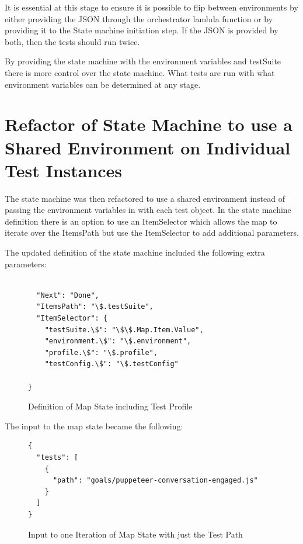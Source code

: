 \documentclass[12pt,a4paper,titlepage]{report}
\begin{document}
It is essential at this stage to ensure it is possible to flip between environments by either providing the JSON through the
orchestrator lambda function or by providing it to the State machine initiation step. If the JSON is provided by both, then the tests should run twice.

By providing the state machine with the environment variables and testSuite there is more control over the state
machine. What tests are run with what environment variables can be determined at any stage.

\section{Refactor of State Machine to use a Shared Environment on Individual Test Instances }

The state machine was then refactored to use a shared environment instead of
passing the environment variables in with each test object. In the state machine definition there is an option to
use an ItemSelector which allows the map to iterate over the ItemsPath but use the ItemSelector to add additional
parameters.

The updated definition of the state machine included the following extra parameters:

\begin{figure}[H]
  \begin{tcolorbox}
    \begin{verbatim}

  "Next": "Done",
  "ItemsPath": "\$.testSuite",
  "ItemSelector": {
    "testSuite.\$": "\$\$.Map.Item.Value",
    "environment.\$": "\$.environment",
    "profile.\$": "\$.profile",
    "testConfig.\$": "\$.testConfig"

}
\end{verbatim}
  \end{tcolorbox}
  \caption{Definition of Map State including Test Profile}
\end{figure}

The input to the map state became the following:

\begin{figure}[H]
  \begin{tcolorbox}
    \begin{verbatim}
{
  "tests": [
    {
      "path": "goals/puppeteer-conversation-engaged.js"
    }
  ]
}
\end{verbatim}
  \end{tcolorbox}
  \caption{Input to one Iteration of Map State with just the Test Path}
\end{figure}
\end{document}
